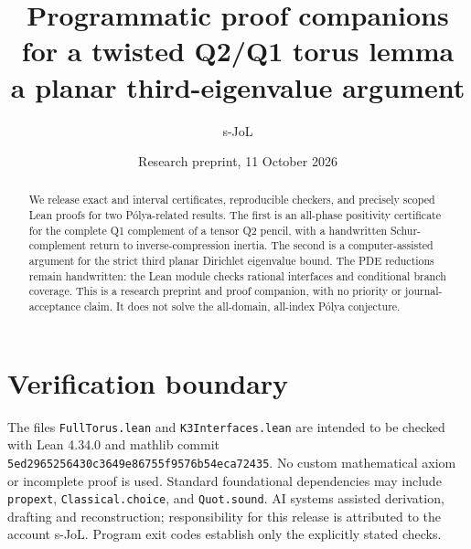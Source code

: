 \documentclass[11pt]{article}
\title{Programmatic proof companions for a twisted Q2/Q1 torus lemma\\a planar third-eigenvalue argument}
\author{s-JoL}
\date{Research preprint, 11 October 2026}
\begin{document}
\maketitle
\begin{abstract}
We release exact and interval certificates, reproducible checkers, and precisely scoped Lean proofs for two P\'olya-related results. The first is an all-phase positivity certificate for the complete Q1 complement of a tensor Q2 pencil, with a handwritten Schur-complement return to inverse-compression inertia. The second is a computer-assisted argument for the strict third planar Dirichlet eigenvalue bound. The PDE reductions remain handwritten: the Lean module checks rational interfaces and conditional branch coverage. This is a research preprint and proof companion, with no priority or journal-acceptance claim. It does not solve the all-domain, all-index P\'olya conjecture.
\end{abstract}
\section{Verification boundary}
The files \texttt{FullTorus.lean} and \texttt{K3Interfaces.lean} are intended to be checked with Lean 4.34.0 and mathlib commit \texttt{5ed2965256430c3649e86755f9576b54eca72435}. No custom mathematical axiom or incomplete proof is used. Standard foundational dependencies may include \texttt{propext}, \texttt{Classical.choice}, and \texttt{Quot.sound}. AI systems assisted derivation, drafting and reconstruction; responsibility for this release is attributed to the account s-JoL. Program exit codes establish only the explicitly stated checks.
\end{document}

